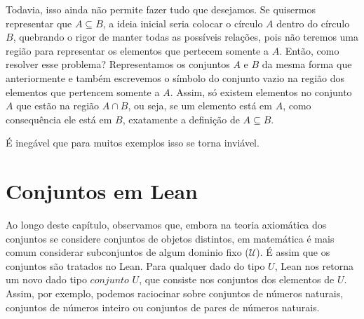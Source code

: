     
    
    Todavia, isso ainda não permite fazer tudo que desejamos. Se quisermos representar que $A \subseteq B$, a ideia inicial seria colocar o círculo $A$ dentro do círculo $B$, quebrando o rigor de manter todas as possíveis relações, pois não teremos uma região para representar os elementos que pertecem somente a $A$. Então, como resolver esse problema? Representamos os conjuntos $A$ e $B$ da mesma forma que anteriormente e também escrevemos o símbolo do conjunto vazio na região dos elementos que pertencem somente a $A$. Assim, só existem elementos no conjunto $A$ que estão na região $A\cap B$, ou seja, se um elemento está em $A$, como consequência ele está em $B$, exatamente a definição de $A \subseteq B$.
    
    
    É inegável que para muitos exemplos isso se torna inviável.

\section{Conjuntos em Lean}
    
    Ao longo deste capítulo, observamos que, embora na teoria axiomática dos conjuntos se considere conjuntos de objetos distintos, em matemática é mais comum considerar subconjuntos de algum dominio fixo ($\mathcal U $). É assim que os conjuntos são tratados no Lean. Para qualquer dado do tipo $U$, Lean nos retorna um novo dado tipo $conjunto$ $U$, que consiste nos conjuntos dos elementos de $U$. Assim, por exemplo, podemos raciocinar sobre conjuntos de números naturais, conjuntos de números inteiro ou conjuntos de pares de números naturais.

